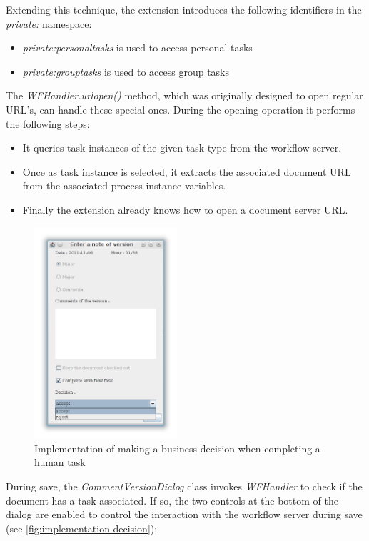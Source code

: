 Extending this technique, the extension introduces the following identifiers in
the \emph{private:} namespace:

\begin{itemize}
\item \emph{private:personaltasks} is used to access personal tasks
\item \emph{private:grouptasks} is used to access group tasks
\end{itemize}

The \emph{WFHandler.urlopen()} method, which was originally designed to open
regular URL's, can handle these special ones. During the opening operation it performs the following steps:

\begin{itemize}
\item It queries task instances of the given task type from the workflow server.
\item Once as task instance is selected, it extracts the associated document URL from the associated process instance variables.
\item Finally the extension already knows how to open a document server URL.
\end{itemize}

\begin{figure}[H]
\centering
\includegraphics[width=200px,keepaspectratio]{implementation-decision.png}
\caption{Implementation of making a business decision when completing a human task}
\label{fig:implementation-decision}
\end{figure}

During save, the \emph{CommentVersionDialog} class invokes \emph{WFHandler} to
check if the document has a task associated. If so, the two controls at the
bottom of the dialog are enabled to control the interaction with the workflow
server during save (see \autoref{fig:implementation-decision}):

